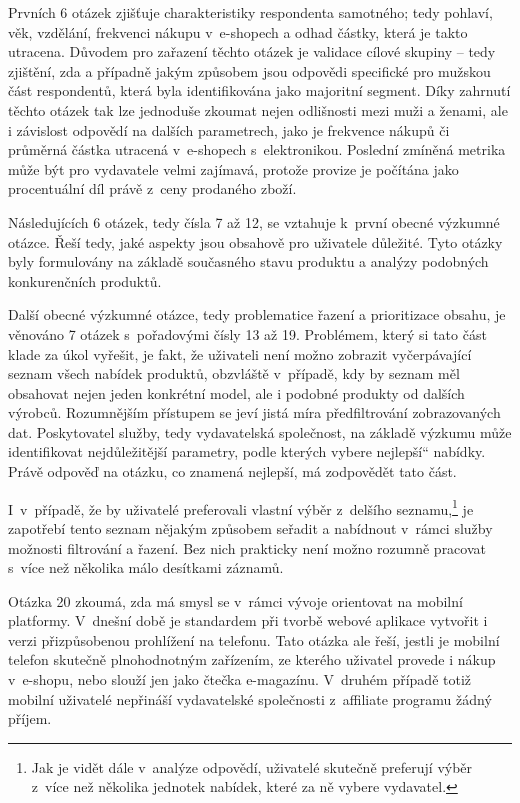 \documentclass[12pt,twoside,openany]{fithesis}
\begin{document}
Prvních 6 otázek 
zjišťuje charakteristiky respondenta samotného; tedy pohlaví, věk, 
vzdělání, frekvenci nákupu v~e-shopech a odhad částky, která je takto 
utracena. Důvodem pro zařazení těchto otázek je validace cílové skupiny 
-- tedy zjištění, zda a případně jakým způsobem jsou odpovědi 
specifické pro mužskou část respondentů, která byla identifikována jako 
majoritní segment. Díky zahrnutí těchto otázek tak lze jednoduše zkoumat 
nejen odlišnosti mezi muži a ženami, ale i závislost odpovědí na dalších 
parametrech, jako je frekvence nákupů či průměrná částka utracená 
v~e-shopech s~elektronikou. Poslední zmíněná metrika může být pro 
vydavatele velmi zajímavá, protože provize je počítána jako 
procentuální díl právě z~ceny prodaného zboží.

Následujících 6 otázek, tedy čísla 7 až 12, se vztahuje k~první obecné 
výzkumné otázce. Řeší tedy, jaké aspekty jsou obsahově pro uživatele 
důležité. Tyto otázky byly formulovány na základě současného stavu 
produktu a analýzy podobných konkurenčních produktů.

Další obecné výzkumné otázce, tedy problematice řazení a prioritizace obsahu, 
je věnováno 7 otázek s~pořadovými čísly 13 až 19. Problémem, který si 
tato část klade za úkol vyřešit, je fakt, že uživateli není možno 
zobrazit vyčerpávající seznam všech nabídek produktů, obzvláště 
v~případě, kdy by seznam měl obsahovat nejen jeden konkrétní model, ale i 
podobné produkty od dalších výrobců. Rozumnějším přístupem se jeví 
jistá míra předfiltrování zobrazovaných dat. Poskytovatel služby, tedy 
vydavatelská společnost, na základě výzkumu může identifikovat 
nejdůležitější parametry, podle kterých vybere \glqq 
nejlepší\textquotedblleft{} nabídky. Právě odpověď na otázku, co 
znamená nejlepší, má zodpovědět tato část.

I~v~případě, že by uživatelé preferovali vlastní výběr z~delšího 
seznamu,\footnote{
    Jak je vidět dále v~analýze odpovědí, uživatelé skutečně 
preferují výběr z~více než několika jednotek nabídek, které za ně 
vybere vydavatel.
} je zapotřebí tento
seznam nějakým způsobem seřadit a nabídnout v~rámci služby možnosti 
filtrování a řazení. Bez nich prakticky není možno rozumně pracovat 
s~více než několika málo desítkami záznamů.

Otázka 20 zkoumá, zda má smysl se v~rámci vývoje orientovat na mobilní 
platformy. V~dnešní době je standardem při tvorbě webové aplikace 
vytvořit i verzi přizpůsobenou prohlížení na telefonu. Tato otázka ale 
řeší, jestli je mobilní telefon skutečně plnohodnotným zařízením, ze 
kterého uživatel provede i nákup v~e-shopu, nebo slouží jen jako čtečka 
e-magazínu. V~druhém případě totiž mobilní uživatelé nepřináší 
vydavatelské společnosti z~affiliate programu žádný příjem.
\end{document}
